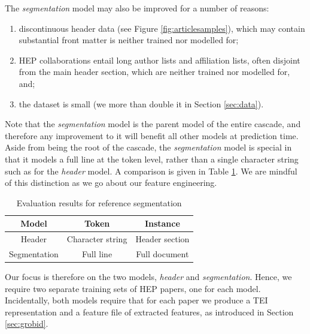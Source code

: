 The \emph{segmentation} model may also be improved for a number of reasons:

\begin{enumerate}
\item discontinuous header data (see Figure \ref{fig:articlesamples}), which may contain substantial front matter is neither trained nor modelled for;
\item HEP collaborations entail long author lists and affiliation lists, often disjoint from the main header section, which are neither trained nor modelled for, and;
\item the dataset is small (we more than double it in Section \ref{sec:data}).
\end{enumerate}

Note that the \emph{segmentation} model is the parent model of the entire cascade, and therefore any improvement to it will benefit all other models at prediction time. Aside from being the root of the cascade, the \emph{segmentation} model is special in that it models a full line at the token level, rather than a single character string such as for the \emph{header} model. A comparison is given in Table \ref{table:headervssegmentation}. We are mindful of this distinction as we go about our feature engineering.

\begin{table}[h]
\begin{center}
\begin{tabular}{|c|c|c|}
\hline
Model & Token & Instance \\
\hline
Header & Character string & Header section \\
\hline
Segmentation & Full line & Full document \\
\hline
\end{tabular}
\caption[Comparison of token and instance entities for \emph{header} and \emph{segmentation} models. For information on \emph{fields} tagged by these models, see Section \ref{sec:grobid}.]{Evaluation results for reference segmentation}
\label{table:headervssegmentation}
\end{center}
\end{table}

Our focus is therefore on the two models, \emph{header} and \emph{segmentation}. Hence, we require two separate training sets of HEP papers, one for each model. Incidentally, both models require that for each paper we produce a TEI representation and a feature file of extracted features, as introduced in Section \ref{sec:grobid}.

